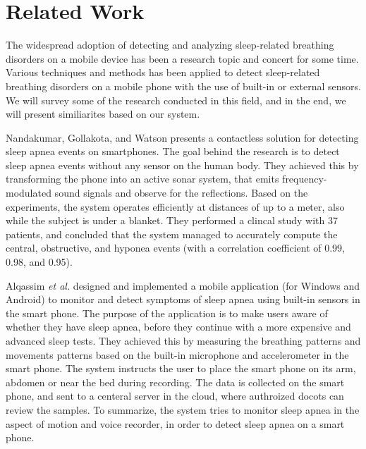 \chapter{Related Work}
The widespread adoption of detecting and analyzing sleep-related breathing disorders on a mobile device has been a research topic and concert for some time. Various techniques and methods has been applied to detect sleep-related breathing disorders on a mobile phone with the use of built-in or external sensors. We will survey some of the research conducted in this field, and in the end, we will present similiarites based on our system. 

Nandakumar, Gollakota, and Watson\cite{contactless_sleep} presents a contactless solution for detecting sleep apnea events on smartphones. The goal behind the research is to detect sleep apnea events without any sensor on the human body. They achieved this by transforming the phone into an active sonar system, that emits frequency-modulated sound signals and observe for the reflections. Based on the experiments, the system operates efficiently at distances of up to a meter, also while the subject is under a blanket. They performed a clincal study with 37 patients, and concluded that the system managed to accurately compute the central, obstructive, and hyponea events (with a correlation coefficient of 0.99, 0.98, and 0.95). 

Alqassim \textit{et al.}\cite{sam} designed and implemented a mobile application (for Windows and Android) to monitor and detect symptoms of sleep apnea using built-in sensors in the smart phone. The purpose of the application is to make users aware of whether they have sleep apnea, before they continue with a more expensive and advanced sleep tests. They achieved this by measuring the breathing patterns and movements patterns based on the built-in microphone and accelerometer in the smart phone. The system instructs the user to place the smart phone on its arm, abdomen or near the bed during recording. The data is collected on the smart phone, and sent to a centeral server in the cloud, where authroized docots can review the samples. To summarize, the system tries to monitor sleep apnea in the aspect of motion and voice recorder, in order to detect sleep apnea on a smart phone. 

